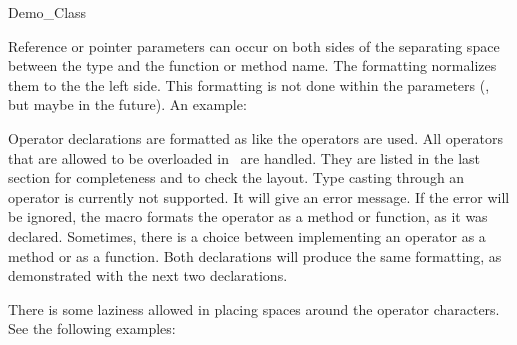 \begin{class}{Demo_Class}
{  

Reference or pointer parameters can occur on both sides of the
separating space between the type and the function or method name. The
formatting normalizes them to the the left side. This formatting is
not done within the parameters (, but maybe in the future). An example:





Operator declarations are formatted as like the operators are
used.  All operators that are allowed to be overloaded in \CC\ are
handled. They are listed in the last section for completeness and
to check the layout. Type casting through an operator is currently
not supported. It will give an error message. If the error will be
ignored, the macro formats the operator as a method or function,
as it was declared. Sometimes, there is a choice between
implementing an operator as a method or as a function. Both
declarations will produce the same formatting, as demonstrated
with the next two declarations.



There is some laziness allowed in placing spaces around the operator
characters. See the following examples:





}
\end{class}
